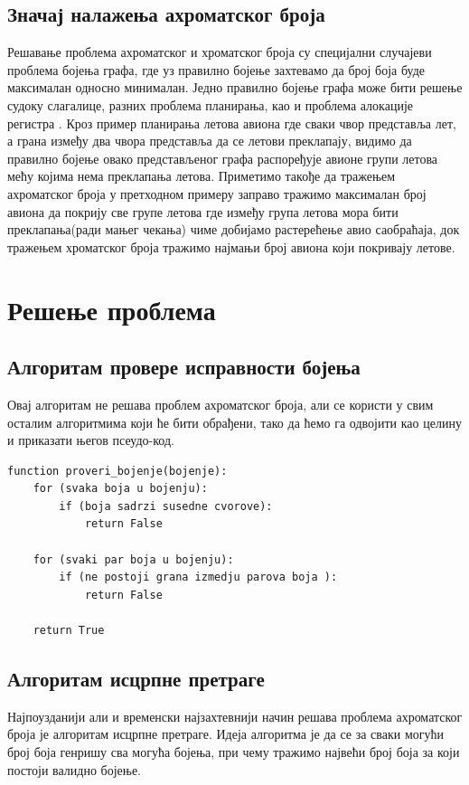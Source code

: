 \documentclass[a4paper]{article}
\begin{document}
{	\subsection{Значај налажења ахроматског броја}
	Решавање проблема ахроматског и хроматског броја су специјални случајеви проблема бојења графа, где уз правилно бојење захтевамо да број боја буде максималан односно минималан. Једно правилно бојење графа може бити решење судоку слагалице, разних проблема планирања, као и проблема алокације регистра \cite{coloringapplications}. Кроз пример планирања летова авиона где сваки чвор представља лет, а грана између два чвора представља да се летови преклапају, видимо да правилно бојење овако представљеног графа распоређује авионе групи летова мећу којима нема преклапања летова. Приметимо такође да тражењем ахроматског броја у претходном примеру заправо тражимо максималан број авиона да покрију све групе летова где између група летова мора бити преклапања(ради мањег чекања) чиме добијамо растерећење авио саобраћаја, док тражењем хроматског броја тражимо најмањи број авиона који покривају летове.  



\section{Решење проблема}
\label{sec:problem-solution}

\subsection{Алгоритам провере исправности бојења}
Овај алгоритам не решава проблем ахроматског броја, али се користи у свим осталим алгоритмима који ће бити обрађени, тако да ћемо га одвојити као целину и приказати његов псеудо-код. \\

\begin{lstlisting}[caption={Псеудо-код провере исправности бојења},frame=single]
function proveri_bojenje(bojenje):
	for (svaka boja u bojenju):
		if (boja sadrzi susedne cvorove):
			return False
	
	for (svaki par boja u bojenju):
		if (ne postoji grana izmedju parova boja ):
			return False
			
	return True
\end{lstlisting}
 
\subsection{Алгоритам исцрпне претраге}
Најпоузданији али и временски најзахтевнији начин решава проблема ахроматског броја је алгоритам исцрпне претраге. Идеја алгоритма је да се за сваки могући број боја генришу сва могућа бојења, при чему тражимо највећи број боја за који постоји валидно бојење. \\ 

}
\end{document}

